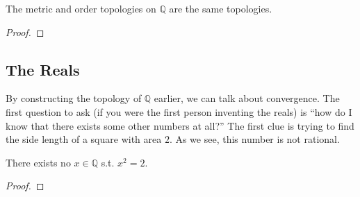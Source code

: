 \documentclass{article}
\begin{document}
      \begin{theorem}
        The metric and order topologies on $\mathbb{Q}$ are the same topologies. 
      \end{theorem}
      \begin{proof}
        
      \end{proof}

  \subsection{The Reals}

      By constructing the topology of $\mathbb{Q}$ earlier, we can talk about convergence. The first question to ask (if you were the first person inventing the reals) is ``how do I know that there exists some other numbers at all?'' The first clue is trying to find the side length of a square with area $2$. As we see, this number is not rational. 

      \begin{theorem}
        There exists no $x \in \mathbb{Q}$ s.t. $x^2 = 2$. 
      \end{theorem}
      \begin{proof}
        
      \end{proof} 
\end{document}
